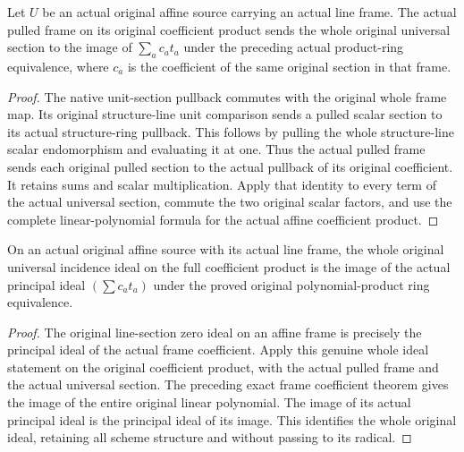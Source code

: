 \begin{lemma}
\label{lem:kn-nadel-bertini-universal-frame-coefficient}
\leanok
{}
Let $U$ be an actual original affine source carrying an actual line frame.
The actual pulled frame on its original coefficient product sends the
whole original universal section to the image of
$\sum_a c_a t_a$ under the preceding actual product-ring equivalence,
where $c_a$ is the coefficient of the same original section in that frame.
\end{lemma}
\begin{proof}
The native unit-section pullback commutes with the original whole frame
map. Its original structure-line unit comparison sends a pulled scalar
section to its actual structure-ring pullback. This follows by pulling
the whole structure-line scalar endomorphism and evaluating it at one.
Thus the actual pulled frame sends each original pulled section to the
actual pullback of its original coefficient. It retains sums and scalar
multiplication. Apply that identity to every term of the actual universal
section, commute the two original scalar factors, and use the complete
linear-polynomial formula for the actual affine coefficient product.
\end{proof}

\begin{lemma}
\label{lem:kn-nadel-bertini-affine-incidence-ideal}
\leanok
{}
On an actual original affine source with its actual line frame, the whole
original universal incidence ideal on the full coefficient product is the
image of the actual principal ideal $(\sum c_a t_a)$ under the proved
original polynomial-product ring equivalence.
\end{lemma}
\begin{proof}
The original line-section zero ideal on an affine frame is precisely the
principal ideal of the actual frame coefficient. Apply this genuine whole
ideal statement on the original coefficient product, with the actual
pulled frame and the actual universal section. The preceding exact frame
coefficient theorem gives the image of the entire original linear
polynomial. The image of its actual principal ideal is the principal ideal
of its image. This identifies the whole original ideal, retaining all
scheme structure and without passing to its radical.
\end{proof}

